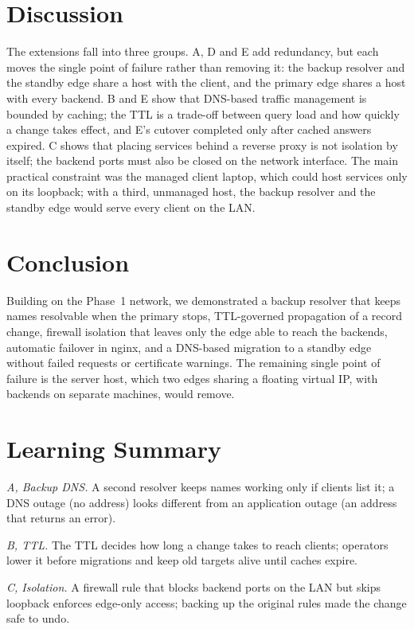 \documentclass[conference]{IEEEtran}
\begin{document}
\section{Discussion}
The extensions fall into three groups. A, D and E add redundancy, but each moves the single point of failure rather than removing it: the backup resolver and the standby edge share a host with the client, and the primary edge shares a host with every backend. B and E show that DNS-based traffic management is bounded by caching; the TTL is a trade-off between query load and how quickly a change takes effect, and E's cutover completed only after cached answers expired. C shows that placing services behind a reverse proxy is not isolation by itself; the backend ports must also be closed on the network interface. The main practical constraint was the managed client laptop, which could host services only on its loopback; with a third, unmanaged host, the backup resolver and the standby edge would serve every client on the LAN.

\section{Conclusion}
Building on the Phase~1 network, we demonstrated a backup resolver that keeps names resolvable when the primary stops, TTL-governed propagation of a record change, firewall isolation that leaves only the edge able to reach the backends, automatic failover in nginx, and a DNS-based migration to a standby edge without failed requests or certificate warnings. The remaining single point of failure is the server host, which two edges sharing a floating virtual IP, with backends on separate machines, would remove.

\section*{Learning Summary}
\textit{A, Backup DNS.} A second resolver keeps names working only if clients list it; a DNS outage (no address) looks different from an application outage (an address that returns an error).

\textit{B, TTL.} The TTL decides how long a change takes to reach clients; operators lower it before migrations and keep old targets alive until caches expire.

\textit{C, Isolation.} A firewall rule that blocks backend ports on the LAN but skips loopback enforces edge-only access; backing up the original rules made the change safe to undo.
\end{document}
